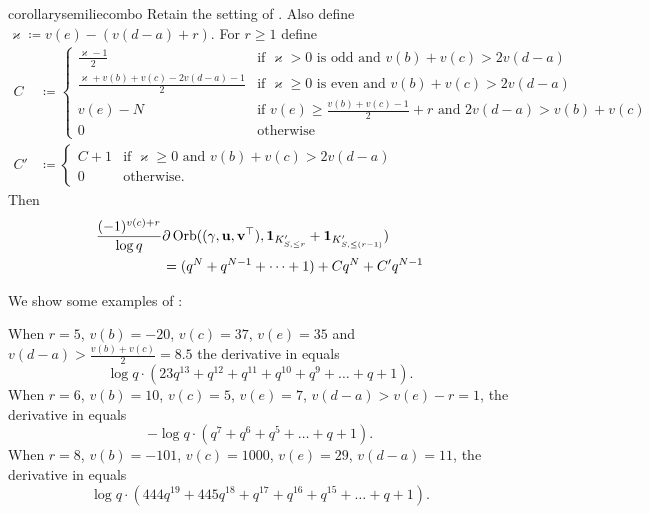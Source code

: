 \begin{restatable}{corollary}{semiliecombo}
  \label{cor:semi_lie_combo}
  Retain the setting of .
  Also define $\varkappa \coloneqq v(e) - (v(d-a)+r)$.
  For $r \ge 1$ define
  \begin{align*}
    C &\coloneqq
    \begin{cases}
      \frac{\varkappa-1}{2}
        & \text{if } \varkappa > 0 \text{ is odd}
          \text{ and } v(b) + v(c) > 2v(d-a)  \\
      \frac{\varkappa+v(b)+v(c)-2v(d-a)-1}{2}
        & \text{if } \varkappa \ge 0 \text{ is even}
          \text{ and } v(b) + v(c) > 2v(d-a)  \\
      v(e) - N
        & \text{if } v(e) \ge \frac{v(b)+v(c)-1}{2} + r
        \text{ and } 2v(d-a) > v(b) + v(c) \\
      0 & \text{otherwise}
    \end{cases} \\
    C' &\coloneqq
    \begin{cases}
      C + 1 & \text{if } \varkappa \ge 0 \text{ and } v(b)+v(c) > 2v(d-a) \\
      0 & \text{otherwise}.
    \end{cases}
  \end{align*}
  Then
  \begin{align*}
    \frac{(-1)^{v(c)+r}}{\log q} &
    \partial\operatorname{Orb}({(\gamma, \mathbf u, \mathbf v^\top)}, \mathbf{1}_{K'_{S, \le r}} + \mathbf{1}_{K'_{S, \le (r-1)}}) \\
    &= (q^N + q^{N-1} + \dots + 1) + C q^N + C' q^{N-1}
  \end{align*}
\end{restatable}

\begin{example}
  We show some examples of :
  \begin{itemize}
  \ii When $r=5$, $v(b) = -20$, $v(c) = 37$, $v(e) = 35$ and $v(d-a) > \frac{v(b)+v(c)}{2} = 8.5$
  the derivative in  equals
  \[ \log q \cdot (23q^{13} + q^{12} + q^{11} + q^{10} + q^9 + \dots + q + 1). \]
  \ii When $r = 6$, $v(b) = 10$, $v(c) = 5$, $v(e) = 7$, $v(d-a) > v(e)-r = 1$,
  the derivative in  equals
  \[ -\log q \cdot (q^7 + q^6 + q^5 + \dots + q + 1). \]
  \ii When $r = 8$, $v(b) = -101$, $v(c) = 1000$, $v(e) = 29$, $v(d-a) = 11$,
  the derivative in  equals
  \[ \log q \cdot (444 q^{19} + 445q^{18} + q^{17} + q^{16} + q^{15} + \dots + q + 1). \]
  \end{itemize}
\end{example}

